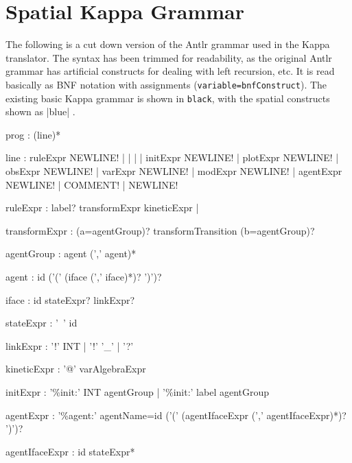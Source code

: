 \chapter{Spatial Kappa Grammar}
\label{chap:spatialGrammar}



The following is a cut down version of the Antlr grammar used in the Kappa translator. The syntax has been trimmed for readability, as the original Antlr grammar has artificial constructs for dealing with left recursion, etc. It is read basically as BNF notation with assignments (\verb|variable=bnfConstruct|). The existing basic Kappa grammar is shown in \verb|black|, with the spatial constructs shown as |blue| . 


\begin{bnfsource}
prog :
  (line)*

line :
  ruleExpr NEWLINE!
  | 
  | 
  | 
  | initExpr NEWLINE!
  | plotExpr NEWLINE!
  | obsExpr NEWLINE!
  | varExpr NEWLINE!
  | modExpr NEWLINE!
  | agentExpr NEWLINE!
  | COMMENT!
  | NEWLINE!

ruleExpr :
  label? transformExpr kineticExpr 
  | 

transformExpr :
  (a=agentGroup)? transformTransition (b=agentGroup)?

agentGroup :
  agent (',' agent)*

agent :
  id  ('(' (iface (',' iface)*)? ')')?

iface :
  id stateExpr? linkExpr?

stateExpr :
  '~' id

linkExpr :
  '!' INT 
  | '!' '_' 
  | '?'

kineticExpr :
  '@' varAlgebraExpr

initExpr :
  '\%init:' INT  agentGroup
  | '\%init:' label  agentGroup

agentExpr :
  '\%agent:' agentName=id ('(' (agentIfaceExpr (',' agentIfaceExpr)*)? ')')?

agentIfaceExpr :
  id stateExpr*





\end{bnfsource}
